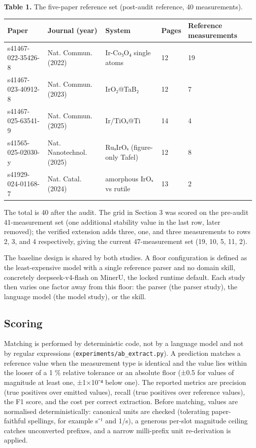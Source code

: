 \textbf{Table 1.} The five-paper reference set (post-audit reference, 40
measurements).

\begin{longtable}[]{@{}L{0.24}L{0.16}L{0.23}L{0.06}L{0.13}@{}}
\toprule\noalign{}
Paper & Journal (year) & System & Pages & Reference measurements \\
\midrule\noalign{}
\endhead
\bottomrule\noalign{}
\endlastfoot
s41467-022-35426-8 & Nat. Commun. (2022) & Ir-Co₃O₄ single atoms & 12 &
19 \\
s41467-023-40912-8 & Nat. Commun. (2023) & IrO₂@TaB₂ & 12 & 7 \\
s41467-025-63541-9 & Nat. Commun. (2025) & Ir/TiOₓ@Ti & 14 & 4 \\
s41565-025-02030-y & Nat. Nanotechnol. (2025) & RuₓIrOₓ (figure-only
Tafel) & 12 & 8 \\
s41929-024-01168-7 & Nat. Catal. (2024) & amorphous IrOₓ vs rutile & 13
& 2 \\
\end{longtable}

The total is 40 after the audit. The grid in Section 3 was scored on the
pre-audit 41-measurement set (one additional stability value in the last
row, later removed); the verified extension adds three, one, and three
measurements to rows 2, 3, and 4 respectively, giving the current
47-measurement set (19, 10, 5, 11, 2).

The baseline design is shared by both studies. A floor configuration is
defined as the least-expensive model with a single reference parser and
no domain skill, concretely deepseek-v4-flash on MinerU, the locked
runtime default. Each study then varies one factor away from this floor:
the parser (the parser study), the language model (the model study), or
the skill.

\subsection{Scoring}\label{scoring}

Matching is performed by deterministic code, not by a language model and
not by regular expressions (\texttt{experiments/ab\_extract.py}). A
prediction matches a reference value when the measurement type is
identical and the value lies within the looser of a 1 \% relative
tolerance or an absolute floor (±0.5 for values of magnitude at least
one, ±1×10⁻⁴ below one). The reported metrics are precision (true
positives over emitted values), recall (true positives over reference
values), the F1 score, and the cost per correct extraction. Before
matching, values are normalised deterministically: canonical units are
checked (tolerating paper-faithful spellings, for example s⁻¹ and 1/s),
a generous per-slot magnitude ceiling catches unconverted prefixes, and
a narrow milli-prefix unit re-derivation is applied.

